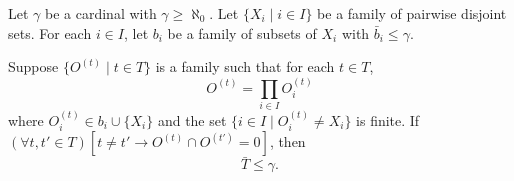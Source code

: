 
Let $\gamma$ be a cardinal with $\gamma \geq \aleph_0$. Let $\{X_i \mid i \in I\}$ be a family of pairwise disjoint sets. For each $i \in I$, let $b_i$ be a family of subsets of $X_i$ with $\bar{b}_i \leq \gamma$.

Suppose $\{O^{(t)} \mid t \in T\}$ is a family such that for each $t \in T$,
$$O^{(t)} = \prod_{i \in I} O_i^{(t)}$$
where $O_i^{(t)} \in b_i \cup \{X_i\}$ and the set $\{i \in I \mid O_i^{(t)} \neq X_i\}$ is finite. If $(\forall t, t' \in T)[t \neq t' \rightarrow O^{(t)} \cap O^{(t')} = 0]$, then
$$\bar{T} \leq \gamma.$$
